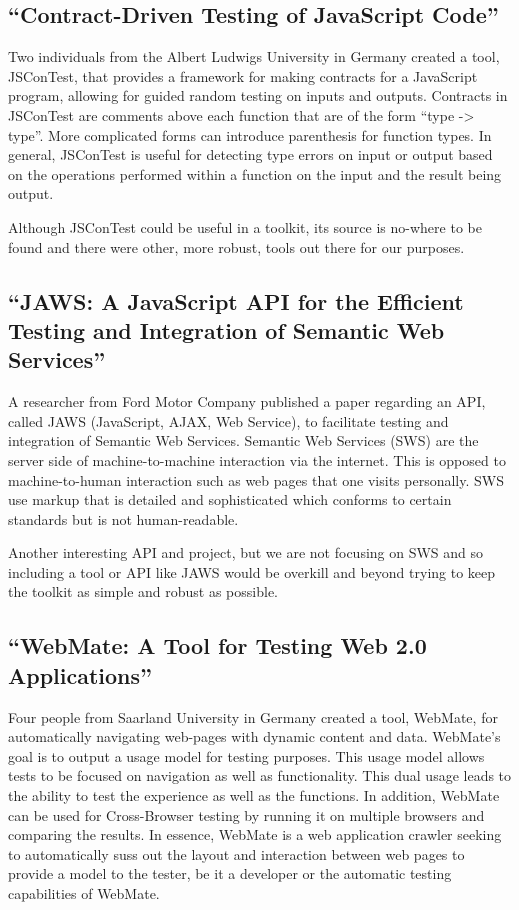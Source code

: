 \documentclass[12pt]{ucthesis}
\begin{document}
\subsection{``Contract-Driven Testing of JavaScript Code''}
Two individuals from the Albert Ludwigs University in Germany created a tool, JSConTest, that provides a framework for making contracts for a JavaScript program, allowing for guided random testing on inputs and outputs\cite{ContractDrivenTesting}. Contracts in JSConTest are comments above each function that are of the form ``type -> type''. More complicated forms can introduce parenthesis for function types. In general, JSConTest is useful for detecting type errors on input or output based on the operations performed within a function on the input and the result being output. 

Although JSConTest could be useful in a toolkit, its source is no-where to be found and there were other, more robust, tools out there for our purposes.

\subsection{``JAWS: A JavaScript API for the Efficient Testing and Integration of Semantic Web Services''}
A researcher from Ford Motor Company published a paper regarding an API, called JAWS (JavaScript, AJAX, Web Service), to facilitate testing and integration of Semantic Web Services\cite{JAWS}. Semantic Web Services (SWS) are the server side of machine-to-machine interaction via the internet. This is opposed to machine-to-human interaction such as web pages that one visits personally. SWS use markup that is detailed and sophisticated which conforms to certain standards but is not human-readable.

Another interesting API and project, but we are not focusing on SWS and so including a tool or API like JAWS would be overkill and beyond trying to keep the toolkit as simple and robust as possible.

\subsection{``WebMate: A Tool for Testing Web 2.0 Applications''}
Four people from Saarland University in Germany created a tool, WebMate, for automatically navigating web-pages with dynamic content and data\cite{WebMate}. WebMate's goal is to output a usage model for testing purposes. This usage model allows tests to be focused on navigation as well as functionality. This dual usage leads to the ability to test the experience as well as the functions. In addition, WebMate can be used for Cross-Browser testing by running it on multiple browsers and comparing the results. In essence, WebMate is a web application crawler seeking to automatically suss out the layout and interaction between web pages to provide a model to the tester, be it a developer or the automatic testing capabilities of WebMate.
\end{document}

